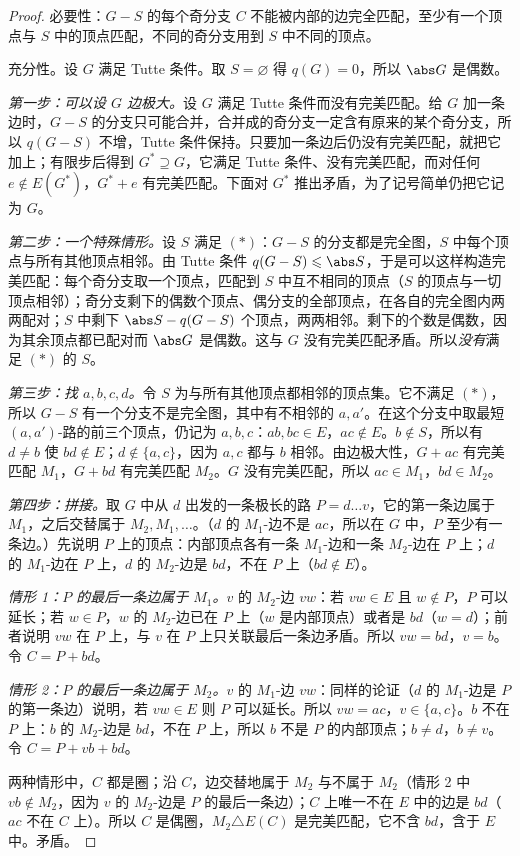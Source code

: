 \begin{proof}
必要性：$G-S$ 的每个奇分支 $C$ 不能被内部的边完全匹配，至少有一个顶点与 $S$ 中的顶点匹配，不同的奇分支用到 $S$ 中不同的顶点。

充分性。设 $G$ 满足 Tutte 条件。取 $S=\varnothing$ 得 $q(G)=0$，所以 $\abs G$ 是偶数。

\emph{第一步：可以设 $G$ 边极大。}设 $G$ 满足 Tutte 条件而没有完美匹配。给 $G$ 加一条边时，$G-S$ 的分支只可能合并，合并成的奇分支一定含有原来的某个奇分支，所以 $q(G-S)$ 不增，Tutte 条件保持。只要加一条边后仍没有完美匹配，就把它加上；有限步后得到 $G^*\supseteq G$，它满足 Tutte 条件、没有完美匹配，而对任何 $e\notin E(G^*)$，$G^*+e$ 有完美匹配。下面对 $G^*$ 推出矛盾，为了记号简单仍把它记为 $G$。

\emph{第二步：一个特殊情形。}设 $S$ 满足 $(*)$：$G-S$ 的分支都是完全图，$S$ 中每个顶点与所有其他顶点相邻。由 Tutte 条件 $q(G-S)\leqslant\abs S$，于是可以这样构造完美匹配：每个奇分支取一个顶点，匹配到 $S$ 中互不相同的顶点（$S$ 的顶点与一切顶点相邻）；奇分支剩下的偶数个顶点、偶分支的全部顶点，在各自的完全图内两两配对；$S$ 中剩下 $\abs S-q(G-S)$ 个顶点，两两相邻。剩下的个数是偶数，因为其余顶点都已配对而 $\abs G$ 是偶数。这与 $G$ 没有完美匹配矛盾。所以\emph{没有}满足 $(*)$ 的 $S$。

\emph{第三步：找 $a,b,c,d$。}令 $S$ 为与所有其他顶点都相邻的顶点集。它不满足 $(*)$，所以 $G-S$ 有一个分支不是完全图，其中有不相邻的 $a,a'$。在这个分支中取最短 $(a,a')$-路的前三个顶点，仍记为 $a,b,c$：$ab,bc\in E$，$ac\notin E$。$b\notin S$，所以有 $d\neq b$ 使 $bd\notin E$；$d\notin\{a,c\}$，因为 $a,c$ 都与 $b$ 相邻。由边极大性，$G+ac$ 有完美匹配 $M_1$，$G+bd$ 有完美匹配 $M_2$。$G$ 没有完美匹配，所以 $ac\in M_1$，$bd\in M_2$。

\emph{第四步：拼接。}取 $G$ 中从 $d$ 出发的一条极长的路 $P=d\dots v$，它的第一条边属于 $M_1$，之后交替属于 $M_2,M_1,\dots$。（$d$ 的 $M_1$-边不是 $ac$，所以在 $G$ 中，$P$ 至少有一条边。）先说明 $P$ 上的顶点：内部顶点各有一条 $M_1$-边和一条 $M_2$-边在 $P$ 上；$d$ 的 $M_1$-边在 $P$ 上，$d$ 的 $M_2$-边是 $bd$，不在 $P$ 上（$bd\notin E$）。

\emph{情形 1：$P$ 的最后一条边属于 $M_1$。}$v$ 的 $M_2$-边 $vw$：若 $vw\in E$ 且 $w\notin P$，$P$ 可以延长；若 $w\in P$，$w$ 的 $M_2$-边已在 $P$ 上（$w$ 是内部顶点）或者是 $bd$（$w=d$）；前者说明 $vw$ 在 $P$ 上，与 $v$ 在 $P$ 上只关联最后一条边矛盾。所以 $vw=bd$，$v=b$。令 $C=P+bd$。

\emph{情形 2：$P$ 的最后一条边属于 $M_2$。}$v$ 的 $M_1$-边 $vw$：同样的论证（$d$ 的 $M_1$-边是 $P$ 的第一条边）说明，若 $vw\in E$ 则 $P$ 可以延长。所以 $vw=ac$，$v\in\{a,c\}$。$b$ 不在 $P$ 上：$b$ 的 $M_2$-边是 $bd$，不在 $P$ 上，所以 $b$ 不是 $P$ 的内部顶点；$b\neq d$，$b\neq v$。令 $C=P+vb+bd$。

两种情形中，$C$ 都是圈；沿 $C$，边交替地属于 $M_2$ 与不属于 $M_2$（情形 2 中 $vb\notin M_2$，因为 $v$ 的 $M_2$-边是 $P$ 的最后一条边）；$C$ 上唯一不在 $E$ 中的边是 $bd$（$ac$ 不在 $C$ 上）。所以 $C$ 是偶圈，$M_2\triangle E(C)$ 是完美匹配，它不含 $bd$，含于 $E$ 中。矛盾。
\end{proof}

